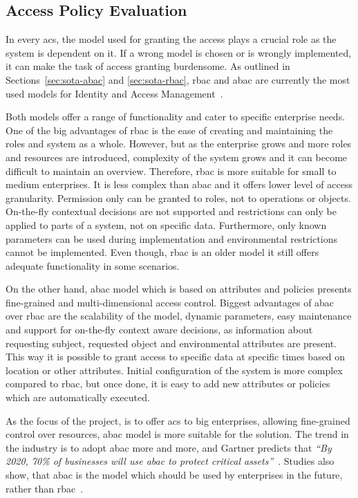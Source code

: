 \subsection{Access Policy Evaluation}\label{sec:analysis-access-policy}

In every \acrlong{acs}, the model used for granting the access plays a crucial role as the system is dependent on it. If a wrong model is chosen or is wrongly implemented, it can make the task of access granting burdensome. As outlined in Sections~\ref{sec:sota-abac} and \ref{sec:sota-rbac}, \acrshort{rbac} and \acrshort{abac} are currently the most used models for Identity and Access Management~\cite{2018BestV3}.

Both models offer a range of functionality and cater to specific enterprise needs. One of the big advantages of \acrshort{rbac} is the ease of creating and maintaining the roles and system as a whole. However, but as the enterprise grows and more roles and resources are introduced, complexity of the system grows and it can become difficult to maintain an overview. Therefore, \acrshort{rbac} is more suitable for small to medium enterprises. It is less complex than \acrshort{abac} and it offers lower level of access granularity. Permission only can be granted to roles, not to operations or objects. On-the-fly contextual decisions are not supported and restrictions can only be applied to parts of a system, not on specific data. Furthermore, only known parameters can be used during implementation and environmental restrictions cannot be implemented. Even though, \acrshort{rbac} is an older model it still offers adequate functionality in some scenarios.

On the other hand, \acrshort{abac} model which is based on attributes and policies presents fine-grained and multi-dimensional access control. Biggest advantages of \acrshort{abac} over \acrshort{rbac} are the scalability of the model, dynamic parameters, easy maintenance and support for on-the-fly context aware decisions, as information about requesting subject, requested object and environmental attributes are present. This way it is possible to grant access to specific data at specific times based on location or other attributes. Initial configuration of the system is more complex compared to \acrshort{rbac}, but once done, it is easy to add new attributes or policies which are automatically executed. 

As the focus of the project, is to offer \acrlong{acs} to big enterprises, allowing fine-grained control over resources, \acrlong{abac} model is more suitable for the solution. The trend in the industry is to adopt \acrshort{abac} more and more, and Gartner predicts that \textit{``By 2020, 70\% of businesses will use \acrshort{abac} to protect critical assets''}~\cite{GartnerGartnerPredictions}. Studies also show, that \acrshort{abac} is the model which should be used by enterprises in the future, rather than \acrshort{rbac}~\cite{Fatima2016TowardsArgument}.

